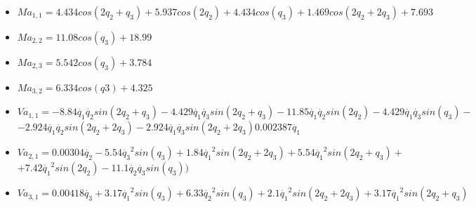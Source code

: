 \begin{itemize}
	\item $ Ma_{1,1}=4.434cos(2q_{2} + q_{3}) + 5.937cos(2q_{2}) + 4.434cos(q_{3}) + 1.469cos(2q_{2} + 2q_{3}) + 7.693$ \\ \vspace{0.2cm}
	\item $ Ma_{2,2}=11.08cos(q_{3}) + 18.99$ \\ \vspace{0.2cm}
	\item $ Ma_{2,3}=5.542cos(q_{3}) + 3.784$ \\ \vspace{0.2cm}
	\item $ Ma_{3,2}=6.334cos(q3) + 4.325$ \\ \vspace{0.2cm}
	\item $ Va_{1,1}=-8.84\dot{q_1}\dot{q_2}sin(2q_2 + q_3) - 4.429\dot{q_1}\dot{q_3}sin(2q_2 + q_3)  -11.85\dot{q_1}\dot{q_2}sin(2q_2) - 4.429\dot{q_1}\dot{q_3}sin(q_3)-$ \\ \vspace{0.1cm}
	 $-2.924\dot{q_1}\dot{q_2}sin(2q_2 + 2q_3) - 2.924\dot{q_1}\dot{q_3}sin(2q_2 + 2q_3) 0.002387\dot{q_1} $ \\ \vspace{0.2cm}
	 \item $ Va_{2,1}=0.00304\dot{q_2} - 5.54\dot{q_3}^{2}sin(q_{3}) + 1.84\dot{q_{1}}^{2}sin(2q_{2} + 2q_{3}) + 5.54\dot{q_1}^{2}sin(2q_{2} + q_{3}) + $ \\ \vspace{0.1cm}
	 $ + 7.42\dot{q_1}^{2}sin(2q_{2}) - 11.1\dot{q_{2}}\dot{q_{3}}sin(q_{3}) ) $\\ \vspace{0.2cm}
	 \item $ Va_{3,1}=0.00418\dot{q_3} + 3.17\dot{q_1}^{2}sin(q_{3}) + 6.33\dot{q_2}^{2}sin(q_{3}) + 2.1\dot{q_1}^{2}sin(2q_{2} + 2q_{3}) + 3.17\dot{q_1}^{2}sin(2q_{2} + q_{3}) $
\end{itemize}
\newpage

